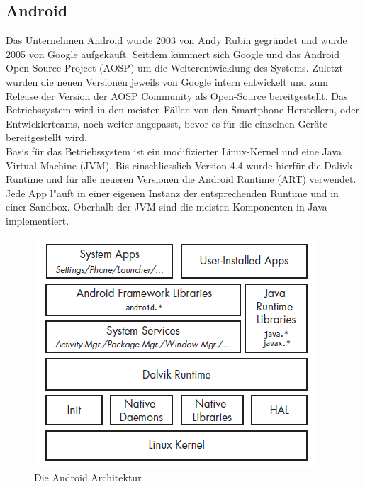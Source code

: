 \subsection{Android}
	Das Unternehmen Android wurde 2003 von Andy Rubin gegründet und wurde 2005 von Google aufgekauft. Seitdem kümmert sich Google und das Android Open Source Project (AOSP) um die Weiterentwicklung des Systems. Zuletzt wurden die neuen Versionen jeweils von Google intern entwickelt und zum Release der Version der AOSP Community als Open-Source bereitgestellt. Das Betriebssystem wird in den meisten Fällen von den Smartphone Herstellern, oder Entwicklerteams, noch weiter angepasst, bevor es für die einzelnen Geräte bereitgestellt wird.\\
	
	Basis für das Betriebssystem ist ein modifizierter Linux-Kernel und eine Java Virtual Machine (JVM)\cite{ArtDalvik}. Bis einschliesslich Version 4.4 wurde hierfür die Dalivk Runtime und für alle neueren Versionen die Android Runtime (ART) verwendet. Jede App l"auft in einer eigenen Instanz der entsprechenden Runtime und in einer Sandbox.\newline
	Oberhalb der JVM sind die meisten Komponenten in Java implementiert.\\
	
	\begin{figure}[h]
		\centering
		\includegraphics[width=0.7\linewidth]{android_pages/graphics/architektur_android_.png}
		\caption{Die Android Architektur \protect\cite[S. 2]{Elenkov2014} }
		\label{fig:architektur_android}
	\end{figure}
	

